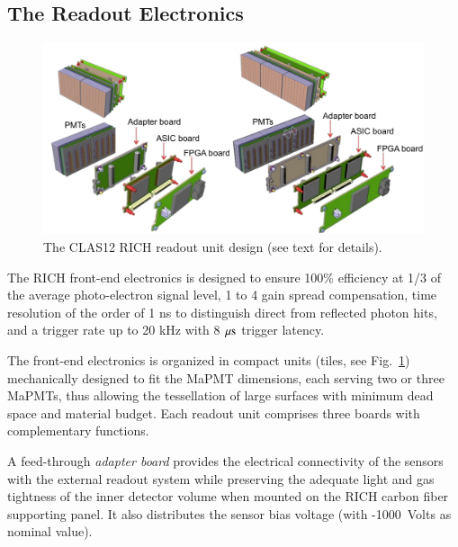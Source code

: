 \documentclass[5p,times,twocolumn]{elsarticle}
\begin{document}
\subsection{The Readout Electronics}

\begin{figure}[t]
\begin{center}
\includegraphics[width=1.00\columnwidth]{TileAssembly.pdf}
\end{center}
\caption{The CLAS12 RICH readout unit design (see text for details).}
\label{fig:EleTile}
\end{figure}

The RICH front-end electronics is designed to ensure 100\% efficiency at 1/3 of the average photo-electron signal level, 1 to 4 gain spread compensation, time resolution of the order of 1 ns to distinguish direct from reflected photon hits, and a trigger rate up to 20 kHz with 8 $\rm \mu s$ trigger latency.

The front-end electronics is organized in compact units (tiles, see Fig.~\ref{fig:EleTile}) mechanically designed to fit the MaPMT dimensions, each serving two or three MaPMTs, thus allowing the tessellation of large surfaces with minimum dead space and material budget. Each readout unit comprises three boards with complementary functions.

A feed-through {\it adapter board} provides the electrical connectivity of the sensors with the external readout system while preserving the adequate light and gas tightness of the inner detector volume when mounted on the RICH carbon fiber supporting panel. It also distributes the sensor bias voltage (with -1000~Volts as nominal value).
\end{document}
